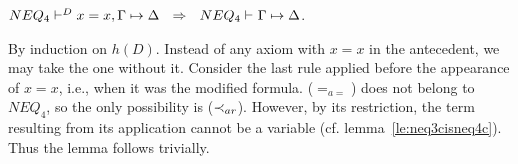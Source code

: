 \begin{LEMMA} \label{le:noxx}
 $\der{NEQ_4}{D}{x=x,\Gamma\Seq\Delta} \ \  \Rightarrow \ \ 
\der{NEQ_4}{}{\Gamma\Seq\Delta}$.\end{LEMMA}
\begin{PROOF} 
By induction on $h(D)$. Instead of any axiom with $x=x$ in the antecedent, we may
take the one without it. 
Consider the last rule applied before the appearance
of $x=x$, i.e., when it was the modified formula. 
($=_{a=}$) does not belong to $NEQ_4$, so the only possibility is
($\mathbin{\prec}_{ar}$). 
However, by its restriction, the term resulting from its application cannot be a variable
(cf. lemma~\ref{le:neq3cisneq4c}). Thus the lemma follows trivially.
% 

\end{PROOF}
